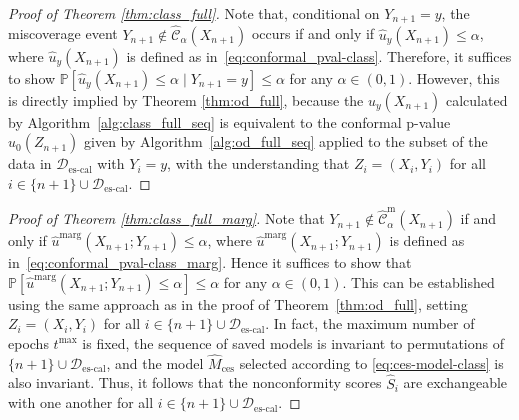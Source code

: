 \begin{proof}[Proof of Theorem \ref{thm:class_full}]
Note that, conditional on $Y_{n+1}=y$, the miscoverage event $Y_{n+1} \not\in \hat{\mathcal{C}}_{\alpha}(X_{n+1})$ occurs if and only if $\hat{u}_y(X_{n+1}) \leq \alpha$, where $\hat{u}_y(X_{n+1})$ is defined as in~\eqref{eq:conformal_pval-class}.
Therefore, it suffices to show $\mathbb{P}\left[\hat{u}_y(X_{n+1}) \leq \alpha \mid Y_{n+1}=y\right] \leq \alpha$ for any $\alpha \in (0,1)$.
However, this is directly implied by Theorem \ref{thm:od_full}, because the $\hat{u}_y(X_{n+1})$ calculated by Algorithm~\ref{alg:class_full_seq} is equivalent to the conformal p-value $\hat{u}_0(Z_{n+1})$ given by Algorithm~\ref{alg:od_full_seq} applied to the subset of the data in $\mathcal{D}_{\text{es-cal}}$ with $Y_{i} = y$, with the understanding that $Z_i=(X_i,Y_i)$ for all $i \in \{n+1\} \cup \mathcal{D}_{\text{es-cal}}$.
\end{proof}

\begin{proof}[Proof of Theorem \ref{thm:class_full_marg}]
Note that $Y_{n+1} \not\in \hat{\mathcal{C}}^{\text{m}}_{\alpha}(X_{n+1})$ if and only if $\hat{u}^{\text{marg}}(X_{n+1};Y_{n+1}) \leq \alpha$, where $\hat{u}^{\text{marg}}(X_{n+1};Y_{n+1})$ is defined as in~\eqref{eq:conformal_pval-class_marg}. Hence it suffices to show that $\mathbb{P}\left[\hat{u}^{\text{marg}}(X_{n+1};Y_{n+1}) \leq \alpha \right] \leq \alpha$ for any $\alpha \in (0,1)$.
This can be established using the same approach as in the proof of Theorem~\ref{thm:od_full}, setting $Z_i=(X_i,Y_i)$ for all $i \in \{n+1\} \cup \mathcal{D}_{\text{es-cal}}$.
In fact, the maximum number of epochs $t^{\text{max}}$ is fixed, the sequence of saved models is invariant to permutations of $\{n+1\} \cup \mathcal{D}_{\text{es-cal}}$, and the model $\hat{M}_{\text{ces}}$ selected according to \eqref{eq:ces-model-class} is also invariant.
Thus, it follows that the nonconformity scores $\hat{S}_i$ are exchangeable with one another for all $i \in \{n+1\} \cup \mathcal{D}_{\text{es-cal}}$.
\end{proof}

